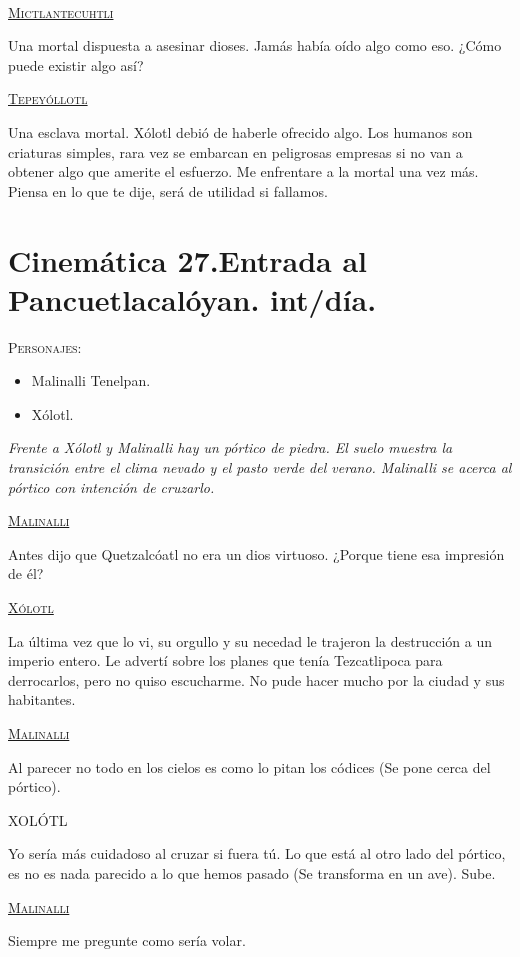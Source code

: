 \documentclass[11pt,letterpaper]{article}
\begin{document}
\begin{center}
\\
\par
\textsc{\underline{Mictlantecuhtli}}
\\
\par
Una mortal dispuesta a asesinar dioses. Jamás había oído algo como eso. ¿Cómo puede existir algo así?
\\
\par
 \textsc{\underline{Tepeyóllotl}}
\\
\par
Una esclava mortal. Xólotl debió de haberle ofrecido algo. Los humanos son criaturas simples, rara vez se embarcan en peligrosas empresas si no van a obtener algo que amerite el esfuerzo. Me enfrentare a la mortal una vez más. Piensa en lo que te dije, será de utilidad si fallamos.
\end{center}

\section{Cinemática 27.Entrada al Pancuetlacalóyan. int/día.}
 \textsc{Personajes}:
 \begin{itemize}
 \item Malinalli Tenelpan.
\item Xólotl.
 \end{itemize}
\textit{Frente a Xólotl y Malinalli hay un pórtico de piedra. El suelo muestra la transición entre el clima nevado y el pasto verde del verano. Malinalli se acerca al pórtico con intención de cruzarlo.}
\begin{center}
\textsc{\underline{Malinalli}}
\\
\par
Antes dijo que Quetzalcóatl no era un dios virtuoso. ¿Porque tiene esa impresión de él?
\\
\par
\textsc{\underline{Xólotl}}
\\
\par
La última vez que lo vi, su orgullo y su necedad le trajeron la destrucción a un imperio entero. Le advertí sobre los planes que tenía Tezcatlipoca para derrocarlos, pero no quiso escucharme. No pude hacer mucho por la ciudad y sus habitantes.
\\
\par
\textsc{\underline{Malinalli}}
\\
\par
Al parecer no todo en los cielos es como lo pitan los códices (Se pone cerca del pórtico).
\\
\par
XOLÓTL
\\
\par
Yo sería más cuidadoso al cruzar si fuera tú. Lo que está al otro lado del pórtico, es no es nada parecido a lo que hemos pasado (Se transforma en un ave). Sube.
\\
\par
\textsc{\underline{Malinalli}}
\\
\par
Siempre me pregunte como sería volar.
\end{center}
\end{document}
